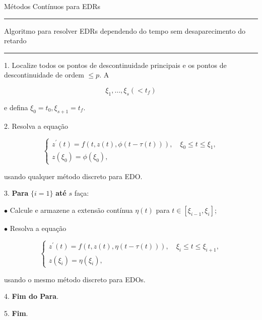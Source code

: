 \documentclass{beamer}
\theoremstyle{plain}
\theoremstyle{definition}
\begin{document}
\begin{frame}{Métodos Contínuos para EDRs}

    \tiny
    \setlength{\columnseprule}{0.4pt}
    \noindent\rule{\textwidth}{0.4pt}
    Algoritmo para resolver EDRs dependendo do tempo sem desaparecimento do retardo
    \noindent\rule{\textwidth}{0.4pt}
    \begin{multicols}{2}
        \phantom{aa} 1. Localize todos os pontos de descontinuidade
        \phantom{aa 1.} principais e os pontos de descontinuidade de 
        \phantom{aaala}  ordem $\leq p$. A

        \[
            \xi_1, \ldots, \xi_s\left(<t_f\right)
        \]

        \noindent
        \phantom{aa 1.} e defina $\xi_0=t_0, \xi_{s+1}=t_f$.

        \phantom{aa} 2. Resolva a equação

            \noindent
            \[
                \left\{\begin{array}{l}
                        z^{\prime}(t)=f(t, z(t), \phi(t-\tau(t))), \quad \xi_0 \leq t \leq \xi_1, \\
                        z\left(\xi_0\right)=\phi\left(\xi_0\right),
                \end{array}\right.
            \]

        \phantom{aaa 2.} usando qualquer método discreto para EDO.  

        \phantom{aa} 3.   \textbf{Para} $\{ i = 1\}$ \textbf{até} $s$ faça:

        \phantom{aaaaaa}$\bullet$ Calcule e armazene a extensão contínua $\eta(t)$ 
        \phantom{aaaaaa} para $t \in\left[\xi_{i-1}, \xi_i\right]$;

        \phantom{aaaaaa}$\bullet$ Resolva a equação

        \noindent
        \[
            \left\{\begin{array}{l}
                    z^{\prime}(t)=f(t, z(t), \eta(t-\tau(t))), \quad \xi_i \leq t \leq \xi_{i+1}, \\
                    z\left(\xi_i\right)=\eta\left(\xi_i\right),
            \end{array}\right.
        \]

        \phantom{aaaaaaa$\bullet$}usando o mesmo método discreto para EDOs.

        \phantom{aa} 4. \textbf{Fim do Para}.

        \phantom{aa} 5. \textbf{Fim}.

\end{multicols}

\end{frame}
\end{document}
